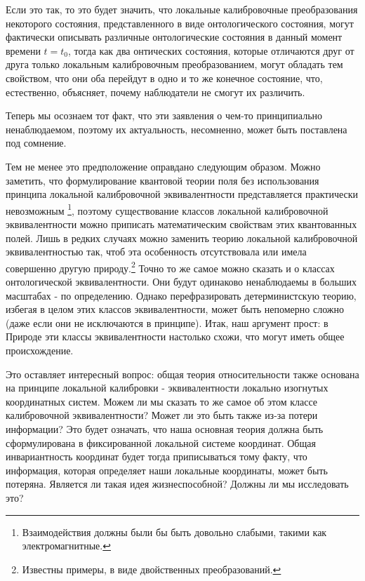 \documentclass[main.tex]{subfiles}
\begin{document}
Если это так, то это будет значить, что локальные калибровочные преобразования некоторого состояния, представленного в виде онтологического состояния, могут фактически описывать различные онтологические состояния в данный момент времени $t = t_0$, тогда как два онтических состояния, которые отличаются друг от друга только локальным калибровочным преобразованием, могут обладать тем свойством, что они оба перейдут в одно и то же конечное состояние, что, естественно, объясняет, почему наблюдатели не смогут их различить.

Теперь мы осознаем тот факт, что эти заявления о чем-то принципиально ненаблюдаемом, поэтому их актуальность, несомненно, может быть поставлена под сомнение.

Тем не менее это предположение оправдано следующим образом. Можно заметить, что формулирование квантовой теории поля без использования принципа локальной калибровочной эквивалентности представляется практически невозможным \footnote{Взаимодействия должны были бы быть довольно слабыми, такими как электромагнитные.}, поэтому существование классов локальной калибровочной эквивалентности можно приписать математическим свойствам этих квантованных полей. Лишь в редких случаях можно заменить теорию локальной калибровочной эквивалентностью так, чтоб эта особенность отсутствовала или имела совершенно другую природу.\footnote{Известны примеры, в виде двойственных преобразований.} Точно то же самое можно сказать и о классах онтологической эквивалентности. Они будут одинаково ненаблюдаемы в больших масштабах - по определению. Однако перефразировать детерминистскую теорию, избегая в целом этих классов эквивалентности, может быть непомерно сложно (даже если они не исключаются в принципе). Итак, наш аргумент прост: в Природе эти классы эквивалентности настолько схожи, что могут иметь общее происхождение.

Это оставляет интересный вопрос: общая теория относительности также основана на принципе локальной калибровки - эквивалентности локально изогнутых координатных систем. Можем ли мы сказать то же самое об этом классе калибровочной эквивалентности? Может ли это быть также из-за потери информации? Это будет означать, что наша основная теория должна быть сформулирована в фиксированной локальной системе координат. Общая инвариантность координат будет тогда приписываться тому факту, что информация, которая определяет наши локальные координаты, может быть потеряна. Является ли такая идея жизнеспособной? Должны ли мы исследовать это?
\end{document}
